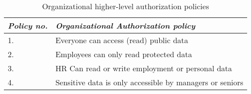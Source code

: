 \begin{table}[t]
\centering
\caption{Organizational higher-level authorization policies}
\label{organizational-auth-policy}
\begin{tabular}{|l|l|}
	\hline
\textit{Policy no.} & \textit{Organizational Authorization policy}                      \\ \hline
1.         & Everyone can access (read) public data                   \\ \hline
2.         & Employees can only read protected data                   \\ \hline
3.         & HR Can read or write employment or personal data         \\ \hline
4.         & Sensitive data is only accessible by managers or seniors \\ \hline
\end{tabular}
\end{table}